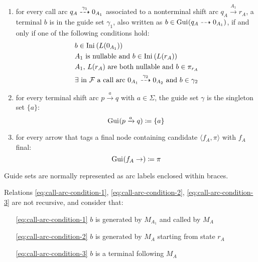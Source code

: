 \documentclass[english]{article}
\begin{document}
\begin{enumerate}
  \item for every call arc \(q_A \stackrel{\gamma_1}{\dashrightarrow} 0_{A_1}\) associated to a nonterminal shift arc \(q_A \xrightarrow{A_1} r_A\), a terminal \(b\) is in the guide set \(\gamma_1\), also written as \(b \in \text{Gui}\hspace{0.1ex}(q_A \dashrightarrow 0_{A_1})\), if and only if one of the following conditions hold:
        \begin{align}
           & b \in \Ini\left( L(0_{A_1}) \right) \label{eq:call-arc-condition-1}                                                                                              \\
           & A_1 \ \text{is nullable and} \ b \in \Ini\left( L(r_A) \right) \label{eq:call-arc-condition-2}                                                                   \\
           & A_1, \, L(r_A) \ \text{are both nullable and} \ b \in \pi_{r_A} \label{eq:call-arc-condition-3}                                                                  \\
           & \exists \ \text{in} \ \mathcal{F} \ \text{a call arc} \ 0_{A_1} \xdashrightarrow{\gamma_2} 0_{A_2} \ \text{and} \ b \in \gamma_2 \label{eq:call-arc-condition-4}
        \end{align}
  \item for every terminal shift arc \(p \xrightarrow{a} q\) with \(a \in \Sigma\), the guide set \(\gamma\) is the singleton set \(\{a\}\):
        \[ \text{Gui}\hspace{0.1ex}(p \xrightarrow{a} q) \coloneqq \left\{ a \right\} \]
  \item for every arrow that tags a final node containing candidate \(\langle f_A, \pi \rangle\) with \(f_A\) final:
        \[ \text{Gui}\hspace{0.1ex}(f_A \rightarrow ) \coloneqq \pi \]
\end{enumerate}

Guide sets are normally represented as arc labels enclosed within braces.

Relations \ref{eq:call-arc-condition-1}, \ref{eq:call-arc-condition-2}, \ref{eq:call-arc-condition-3} are not recursive, and consider that:

\begin{enumerate}
  \item[\ref{eq:call-arc-condition-1}] \(b\) is generated by \(M_{A_1}\) and called by \(M_A\)
  \item[\ref{eq:call-arc-condition-2}] \(b\) is generated by \(M_A\) starting from state \(r_A\)
  \item[\ref{eq:call-arc-condition-3}] \(b\) is a terminal following \(M_A\)
\end{enumerate}
\end{document}
